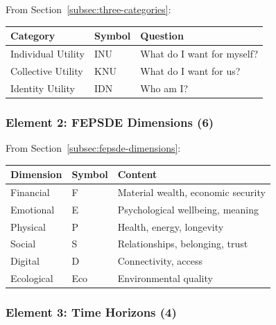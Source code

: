 From Section~\ref{subsec:three-categories}:

\begin{center}
\renewcommand{\arraystretch}{1.3}
\begin{tabular}{@{}lll@{}}
\toprule
\textbf{Category} & \textbf{Symbol} & \textbf{Question} \\
\midrule
Individual Utility & INU & What do I want for myself? \\
Collective Utility & KNU & What do I want for us? \\
Identity Utility & IDN & Who am I? \\
\bottomrule
\end{tabular}
\end{center}

\subsubsection{Element 2: FEPSDE Dimensions (6)}

From Section~\ref{subsec:fepsde-dimensions}:

\begin{center}
\renewcommand{\arraystretch}{1.3}
\begin{tabular}{@{}lll@{}}
\toprule
\textbf{Dimension} & \textbf{Symbol} & \textbf{Content} \\
\midrule
Financial & F & Material wealth, economic security \\
Emotional & E & Psychological wellbeing, meaning \\
Physical & P & Health, energy, longevity \\
Social & S & Relationships, belonging, trust \\
Digital & D & Connectivity, access \\
Ecological & Eco & Environmental quality \\
\bottomrule
\end{tabular}
\end{center}

\subsubsection{Element 3: Time Horizons (4)}

